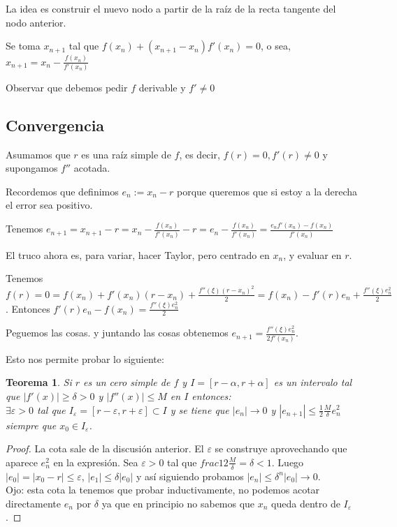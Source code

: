 \documentclass[10pt,a4paper,final]{report}
\newtheorem{theorem}{Teorema}
\begin{document}
{La idea es construir el nuevo nodo a partir de la raíz de la recta tangente del nodo anterior.

Se toma $x_{n+1}$ tal que $f(x_n) + (x_{n+1}-x_n) f'(x_n) = 0$, o sea,
$x_{n+1} = x_n - \frac{f(x_n)}{f'(x_n)}$

Observar que debemos pedir $f$ derivable y $f' \neq 0$

\subsection*{Convergencia}

Asumamos que $r$ es una raíz simple de $f$, es decir, $f(r)=0, f'(r) \neq 0$ y supongamos $f''$ acotada.

Recordemos que definimos $e_n := x_n - r$ porque queremos que si estoy a la derecha el error sea positivo.

Tenemos $e_{n+1} = x_{n+1} - r = x_n - \frac{f(x_n)}{f'(x_n)} - r = e_n - \frac{f(x_n)}{f'(x_n)} = \frac{e_n f'(x_n)-f(x_n)}{f'(x_n)}$

El truco ahora es, para variar, hacer Taylor, pero centrado en $x_n$, y evaluar en $r$.

Tenemos $f(r) = 0 = f(x_n) + f'(x_n) (r-x_n) + \frac{f''(\xi) (r-x_n)^2}{2}= f(x_n) - f'(r) e_n + \frac{f''(\xi) e_n^2}{2}$.  Entonces $f'(r) e_n - f(x_n) = \frac{f''(\xi) e_n^2}{2}$

Peguemos las cosas. y juntando las cosas obtenemos $e_{n+1} = \frac{f''(\xi) e_n^2}{2 f'(x_n)}$.

Esto nos permite probar lo siguiente:

\begin{theorem}
Si $r$ es un cero simple de $f$ y $I=[r-\alpha,r+\alpha]$ es un intervalo tal que $|f'(x)|\geq \delta>0$ y $|f''(x)|\leq M$ en $I$ entonces:\\
$\exists \varepsilon > 0$ tal que $I_{\varepsilon} = [r - \varepsilon, r+\varepsilon] \subset I$ y se tiene que $|e_n| \to 0$ y $|e_{n+1}| \leq \frac{1}{2} \frac{M}{\delta} e_n^2$ siempre que $x_0 \in I_{\varepsilon}$.
\end{theorem}

\begin{proof}
	La cota sale de la discusión anterior. El $\varepsilon$ se construye aprovechando que aparece $e_n^2$ en la expresión. Sea $\varepsilon > 0$ tal que $frac{1}{2} \frac{M}{\delta} = \delta < 1$.
	 Luego $|e_0| = |x_0-r|\leq \varepsilon$, $|e_1| \leq \delta |e_0|$ y así siguiendo probamos $|e_n|\leq \delta^n |e_0| \to 0$.\\
	 Ojo: esta cota la tenemos que probar inductivamente, no podemos acotar directamente $e_n$ por $\delta$ ya que en principio no sabemos que $x_n$ queda dentro de $I_\varepsilon$.
\end{proof}

}
\end{document}

